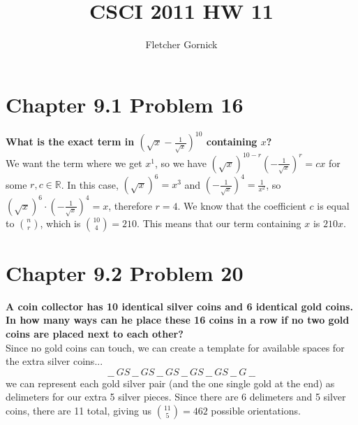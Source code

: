 \documentclass[10pt]{article}
\title{CSCI 2011 HW 11}
\author{Fletcher Gornick}
\begin{document}
\maketitle

\section{Chapter 9.1 Problem 16}
\textbf{What is the exact term in $(\sqrt{x} - \frac{1}{\sqrt{x}})^{10}$ containing $x$?} \\
We want the term where we get $x^1$, so we have $(\sqrt{x})^{10-r}(-\frac{1}{\sqrt{x}})^r = cx$ for some $r,c \in \mathbb{R}$.  In this
case, $(\sqrt{x})^6 = x^3$ and $(-\frac{1}{\sqrt{x}})^4 = \frac{1}{x^2}$, so $(\sqrt{x})^6 \cdot (-\frac{1}{\sqrt{x}})^4 = x$, therefore $r = 4$.
We know that the coefficient $c$ is equal to $\binom{n}{r}$, which is $\binom{10}{4} = 210$.  This means that our term containing $x$ is $210x$.

\section{Chapter 9.2 Problem 20}
\textbf{A coin collector has 10 identical silver coins and 6 identical gold coins.  In how many ways can he place these 16 coins in a
    row if no two gold coins are placed next to each other?} \\
Since no gold coins can touch, we can create a template for available spaces for the extra silver coins...
$$\_\_\ GS\ \_\_\ GS\ \_\_\ GS\ \_\_\ GS\ \_\_\ GS\ \_\_\ G\ \_\_$$
we can represent each gold silver pair (and the one single gold at the end) as delimeters for our extra 5 silver pieces.  Since there are 6
delimeters and 5 silver coins, there are 11 total, giving us $\binom{11}{5} = 462$ possible orientations.
\end{document}
